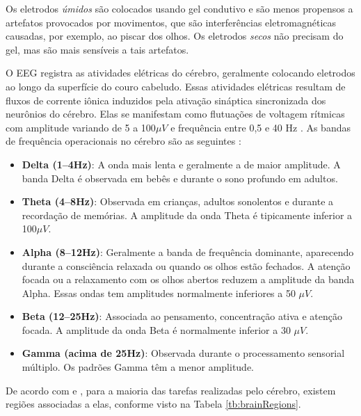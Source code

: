 			\par Os eletrodos \textit{úmidos} são colocados usando gel condutivo e são menos propensos a artefatos provocados por movimentos, que são interferências eletromagnéticas causadas, por exemplo, ao piscar dos olhos. Os eletrodos \textit{secos} não precisam do gel, mas são mais sensíveis a tais artefatos.
			
			\par O EEG registra as atividades elétricas do cérebro, geralmente colocando eletrodos ao longo da superfície do couro cabeludo. Essas atividades elétricas resultam de fluxos de corrente iônica induzidos pela ativação sináptica sincronizada dos neurônios do cérebro. Elas se manifestam como flutuações de voltagem rítmicas com amplitude variando de 5 a 100$\mu V$ e frequência entre 0,5 e 40 Hz \cite{JALALYBIDGOLY2020101788}. As bandas de frequência operacionais no cérebro são as seguintes \cite{sanei2021eeg}:
			
			\begin{itemize}
				\item \textbf{Delta (1–4Hz)}: A onda mais lenta e geralmente a de maior amplitude. A banda Delta é observada em bebês e durante o sono profundo em adultos.
				
				\item \textbf{Theta (4–8Hz)}: Observada em crianças, adultos sonolentos e durante a recordação de memórias. A amplitude da onda Theta é tipicamente inferior a 100$\mu V$.
				
				\item \textbf{Alpha (8–12Hz)}: Geralmente a banda de frequência dominante, aparecendo durante a consciência relaxada ou quando os olhos estão fechados. A atenção focada ou a relaxamento com os olhos abertos reduzem a amplitude da banda Alpha. Essas ondas tem amplitudes normalmente inferiores a 50 $\mu V$.
				
				\item \textbf{Beta (12–25Hz)}: Associada ao pensamento, concentração ativa e atenção focada. A amplitude da onda Beta é normalmente inferior a 30 $\mu V$.
				
				\item \textbf{Gamma (acima de 25Hz)}: Observada durante o processamento sensorial múltiplo. Os padrões Gamma têm a menor amplitude.
				
			\end{itemize}
			
			\par De acordo com \cite{JALALYBIDGOLY2020101788} e \cite{sistema10-20}, para a maioria das tarefas realizadas pelo cérebro, existem regiões associadas a elas, conforme visto na Tabela \autoref{tb:brainRegions}.
			
